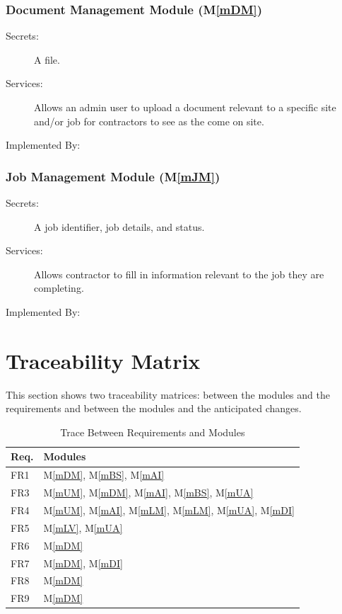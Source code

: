 \documentclass[12pt, titlepage]{article}
\newcommand{\mref}[1]{M\ref{#1}}
\begin{document}
\subsubsection{Document Management Module (\mref{mDM})}
\begin{description}
  \item[Secrets:] A file.
  \item[Services:] Allows an admin user to upload a document relevant
    to a specific site and/or job for contractors to see as the come on site.
  \item[Implemented By:] \progname
\end{description}

\subsubsection{Job Management Module (\mref{mJM})}
\begin{description}
  \item[Secrets:] A job identifier, job details, and status.
  \item[Services:] Allows contractor to fill in information relevant
    to the job they are completing.
  \item[Implemented By:] \progname
\end{description}

\section{Traceability Matrix} \label{SecTM}

This section shows two traceability matrices: between the modules and the
requirements and between the modules and the anticipated changes.

\begin{table}[H]
  \centering
  \begin{tabular}{p{} p{}}
    \toprule
    \textbf{Req.} & \textbf{Modules}
    \\
    \midrule
    FR1            & \mref{mDM}, \mref{mBS}, \mref{mAI}
    \\
    FR3            & \mref{mUM}, \mref{mDM}, \mref{mAI}, \mref{mBS}, \mref{mUA}
    \\
    FR4            & \mref{mUM}, \mref{mAI}, \mref{mLM}, \mref{mLM},
    \mref{mUA}, \mref{mDI}
    \\
    FR5            & \mref{mLV}, \mref{mUA}
    \\
    FR6            & \mref{mDM}
    \\
    FR7            & \mref{mDM}, \mref{mDI}
    \\
    FR8            & \mref{mDM}
    \\
    FR9            & \mref{mDM}
    \\
    \bottomrule
  \end{tabular}
  \caption{Trace Between Requirements and Modules}
  \label{TblRT}
\end{table}
\end{document}
